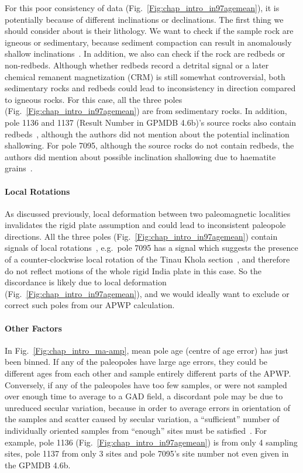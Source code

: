 For this poor consistency of data (Fig.~\ref{Fig:chap_intro_in97agemean}), it
is potentially because of different inclinations or declinations. The first
thing we should consider about is their lithology. We want to check if the
sample rock are igneous or sedimentary, because sediment compaction can result
in anomalously shallow inclinations~\citep{T19}. In addition, we also
can check if the rock are redbeds or non-redbeds. Although whether redbeds
record a detrital signal or a later chemical remanent magnetization (CRM) is
still somewhat controversial, both sedimentary rocks and redbeds could lead to
inconsistency in direction compared to igneous rocks. For this case, all the
three poles (Fig.~\ref{Fig:chap_intro_in97agemean}) are from sedimentary
rocks. In addition, pole 1136 and 1137 (Result Number in GPMDB 4.6b)'s source
rocks also contain redbeds~\citep{O82}, although the authors did not mention
about the potential inclination shallowing. For pole 7095, although the source
rocks do not contain redbeds, the authors did mention about possible inclination
shallowing due to haematite grains~\citep{G94}.

\paragraph{Local Rotations}

As discussed previously, local deformation between two paleomagnetic localities
invalidates the rigid plate assumption and could lead to inconsistent paleopole
directions. All the three poles (Fig.~\ref{Fig:chap_intro_in97agemean})
contain signals of local rotations~\citep{O82,G94}, e.g.\ pole 7095 has a signal
which suggests the presence of a counter-clockwise local rotation of the Tinau
Khola section~\citep{G94}, and therefore do not reflect motions of the whole
rigid India plate in this case. So the discordance is likely due to local
deformation (Fig.~\ref{Fig:chap_intro_in97agemean}), and we would ideally
want to exclude or correct such poles from our APWP calculation.

\paragraph{Other Factors}

In Fig.~\ref{Fig:chap_intro_ma-amp}, mean pole age (centre of age error) has
just been binned. If any of the paleopoles have large age errors, they could be
different ages from each other and sample entirely different parts of the
APWP\@. Conversely, if any of the paleopoles have too few samples, or were not
sampled over enough time to average to a GAD field, a discordant pole may be due
to unreduced secular variation, because in order to average errors in
orientation of the samples and scatter caused by secular variation, a
``sufficient'' number of individually oriented samples from ``enough'' sites
must be satisfied~\citep{T19,v90,B02}. For example, pole 1136
(Fig.~\ref{Fig:chap_intro_in97agemean}) is from only 4 sampling sites, pole 1137
from only 3 sites and pole 7095's site number not even given in the GPMDB 4.6b.

